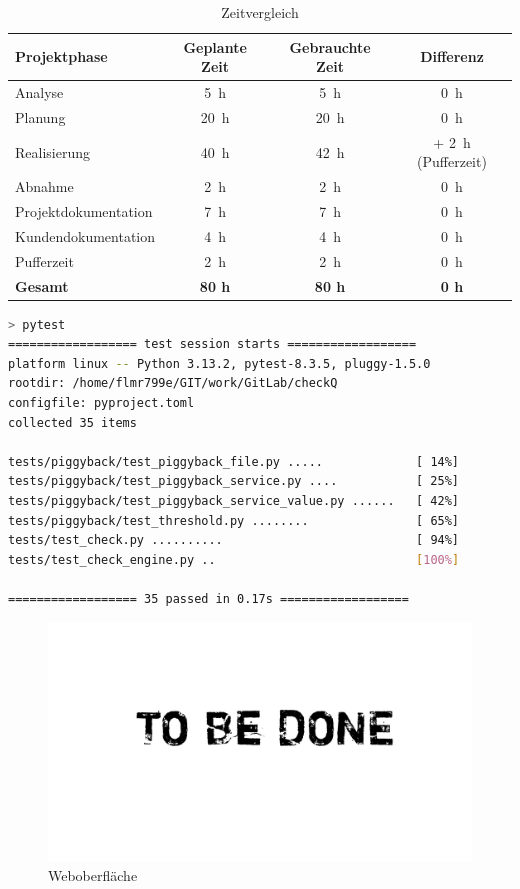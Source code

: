 \begin{table}[H]
  \centering
  \begin{tabular}{l c c c}
    \hline
    \textbf{Projektphase} & \textbf{Geplante Zeit} & \textbf{Gebrauchte Zeit} & \textbf{Differenz}\\
    \hline
    Analyse                 & \qty{5}{\hour}  & \qty{5}{\hour}  & \qty{0}{\hour}\\
    Planung                 & \qty{20}{\hour} & \qty{20}{\hour} & \qty{0}{\hour} \\
    Realisierung            & \qty{40}{\hour} & \qty{42}{\hour} & + \qty{2}{\hour} (Pufferzeit) \\
    Abnahme                 & \qty{2}{\hour}  & \qty{2}{\hour}  & \qty{0}{\hour} \\
    Projektdokumentation    & \qty{7}{\hour}  & \qty{7}{\hour}  & \qty{0}{\hour} \\
    Kundendokumentation     & \qty{4}{\hour}  & \qty{4}{\hour}  & \qty{0}{\hour} \\
    Pufferzeit              & \qty{2}{\hour}  & \qty{2}{\hour}  & \qty{0}{\hour} \\
    \hline
    \textbf{Gesamt} & \textbf{80 h} & \textbf{80 h} & \textbf{0 h} \\
    \hline
  \end{tabular}
  \caption{Zeitvergleich}
  \label{tab:zeitvergleich}
\end{table}

\begin{lstlisting}[language=Bash, caption=Unit-Tests, label=lst:unit-test]
> pytest
================== test session starts ==================
platform linux -- Python 3.13.2, pytest-8.3.5, pluggy-1.5.0
rootdir: /home/flmr799e/GIT/work/GitLab/checkQ
configfile: pyproject.toml
collected 35 items

tests/piggyback/test_piggyback_file.py .....             [ 14%]
tests/piggyback/test_piggyback_service.py ....           [ 25%]
tests/piggyback/test_piggyback_service_value.py ......   [ 42%]
tests/piggyback/test_threshold.py ........               [ 65%]
tests/test_check.py ..........                           [ 94%]
tests/test_check_engine.py ..                            [100%]

================== 35 passed in 0.17s ==================

\end{lstlisting}

\begin{figure}[H]
  \centering
  \includegraphics[width=\textwidth]{images/tbd.png}
  \caption{Weboberfläche}
  \label{fig:checkmk_check_uebersicht}
\end{figure}
